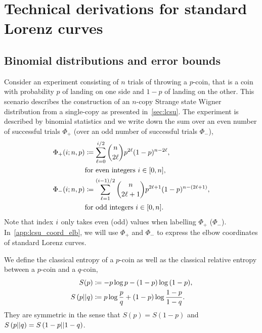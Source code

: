 \section{Technical derivations for standard Lorenz curves}
\label{app:lcsu_technical}

\subsection{Binomial distributions and error bounds}\label{app:phi}
Consider an experiment consisting of $n$ trials of throwing a $p$-coin, that is a coin with probability $p$ of landing on one side and $1-p$ of landing on the other.
This scenario describes the construction of an $n$-copy Strange state Wigner distribution from a single-copy as presented in~\cref{sec:lcsu}.
The experiment is described by binomial statistics and we write down the sum over an even number of successful trials $\Phi_+$ (over an odd number of successful trials $\Phi_-$),
\begin{align}	
	\Phi_+(i; n, p) &\coloneqq \sum\limits_{\ell=0}^{i/2} \binom{n}{2\ell} p^{2\ell} (1-p)^{n-2\ell}, \nonumber\\ 
	&\text{for even integers } i\in[0,n], \label{eq:fp_app} \\
	\Phi_-(i; n, p) &\coloneqq \sum\limits_{\ell=1}^{(i-1)/2} \binom{n}{2\ell+1} p^{2\ell+1} (1-p)^{n-(2\ell+1)}, \nonumber\\ 
	&\text{for odd integers } i\in[0,n]. \label{eq:fn_app}
\end{align}
Note that index $i$ only takes even (odd) values when labelling $\Phi_+$ ($\Phi_-$).
In~\cref{app:lcsu_coord_elb}, we will use $\Phi_+$ and $\Phi_-$ to express the elbow coordinates of standard Lorenz curves.

We define the classical entropy of a $p$-coin as well as the classical relative entropy between a $p$-coin and a $q$-coin,
\begin{align}
	S(p) &\coloneqq -p\log{p} -(1-p)\log{(1-p)}, \label{eq:ent}\\
	S\left( p \middle\vert\middle\vert q \right) &\coloneqq p \log{\frac{p}{q}} + (1-p) \log{\frac{1-p}{1-q}}. \label{eq:ent_rel}
\end{align}
They are symmetric in the sense that $S(p) = S(1-p)$ and $S\left( p \middle\vert\middle\vert q \right) = S\left( 1-p \middle\vert\middle\vert 1-q \right)$.

